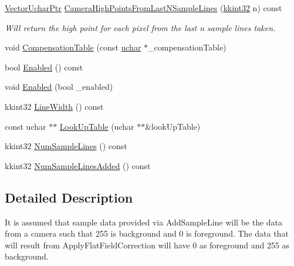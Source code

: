 \begin{DoxyCompactItemize}
\item 
\hyperlink{namespace_k_k_b_ac43cb621a63d628438a729543638a404}{Vector\+Uchar\+Ptr} \hyperlink{class_k_k_l_s_c_1_1_flat_field_correction_aab0bdb0b8b9e6bc8f36bf5afc657e242}{Camera\+High\+Points\+From\+Last\+N\+Sample\+Lines} (\hyperlink{namespace_k_k_b_a8fa4952cc84fda1de4bec1fbdd8d5b1b}{kkint32} n) const 
\begin{DoxyCompactList}\small\item\em Will return the high point for each pixel from the last \textquotesingle{}n\textquotesingle{} sample lines taken. \end{DoxyCompactList}\item 
void \hyperlink{class_k_k_l_s_c_1_1_flat_field_correction_abd33b87c5084acc708e27520ea37ad85}{Compensation\+Table} (const \hyperlink{namespace_k_k_b_ace9969169bf514f9ee6185186949cdf7}{uchar} $\ast$\+\_\+compensation\+Table)
\item 
bool \hyperlink{class_k_k_l_s_c_1_1_flat_field_correction_aac9b517319f8a6bf7b754609d0667cac}{Enabled} () const 
\item 
void \hyperlink{class_k_k_l_s_c_1_1_flat_field_correction_a9981e65551fe0963ea02f63b022ca77a}{Enabled} (bool \+\_\+enabled)
\item 
kkint32 \hyperlink{class_k_k_l_s_c_1_1_flat_field_correction_a2710778d18fbdb4cc38e29e35d7ef638}{Line\+Width} () const 
\item 
const uchar $\ast$$\ast$ \hyperlink{class_k_k_l_s_c_1_1_flat_field_correction_a322be38217bdbe05dae4fe47b0e851e2}{Look\+Up\+Table} (uchar $\ast$$\ast$\&look\+Up\+Table)
\item 
kkint32 \hyperlink{class_k_k_l_s_c_1_1_flat_field_correction_afcd9d37174ede2a106af6422d182a5c9}{Num\+Sample\+Lines} () const 
\item 
kkint32 \hyperlink{class_k_k_l_s_c_1_1_flat_field_correction_a7a04a4c8406a1059ba38736b0ac118b7}{Num\+Sample\+Lines\+Added} () const 
\end{DoxyCompactItemize}


\subsection{Detailed Description}
It is assumed that sample data provided via \textquotesingle{}Add\+Sample\+Line\textquotesingle{} will be the data from a camera such that 255 is background and 0 is foreground. The data that will result from \textquotesingle{}Apply\+Flat\+Field\+Correction\textquotesingle{} will have 0 as foreground and 255 as background. 

